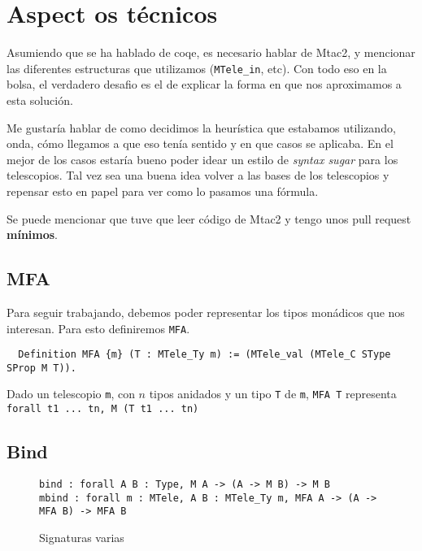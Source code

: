 \section{Aspect os técnicos}

Asumiendo que se ha hablado de coqe, es necesario hablar de Mtac2, y mencionar
las diferentes estructuras que utilizamos (\lstinline{MTele_in}, etc).
Con todo eso en la bolsa, el verdadero desafio es el de explicar la forma en que
nos aproximamos a esta solución.

Me gustaría hablar de como decidimos la heurística que estabamos utilizando,
onda, cómo llegamos a que eso tenía sentido y en que casos se aplicaba.
En el mejor de los casos estaría bueno poder idear un estilo de \textit{syntax
  sugar} para los telescopios.
Tal vez sea una buena idea volver a las bases de los telescopios y repensar esto
en papel para ver como lo pasamos una fórmula.

Se puede mencionar que tuve que leer código de Mtac2 y tengo unos pull request
\textbf{mínimos}.

\subsection{MFA}

Para seguir trabajando, debemos poder representar los tipos monádicos que nos
interesan.
Para esto definiremos \lstinline{MFA}.

\begin{lstlisting}
  Definition MFA {m} (T : MTele_Ty m) := (MTele_val (MTele_C SType SProp M T)).
\end{lstlisting}

Dado un telescopio \lstinline{m}, con $n$ tipos anidados y un tipo \lstinline{T} de
\lstinline{m}, \lstinline{MFA T} representa \lstinline{forall t1 ... tn, M (T t1 ... tn)}


\subsection{Bind}


\begin{figure}[h]
  \centering
  \begin{lstlisting}
bind : forall A B : Type, M A -> (A -> M B) -> M B
mbind : forall m : MTele, A B : MTele_Ty m, MFA A -> (A -> MFA B) -> MFA B
  \end{lstlisting}
  \caption{Signaturas varias}
  \label{fig:bind}
\end{figure}

